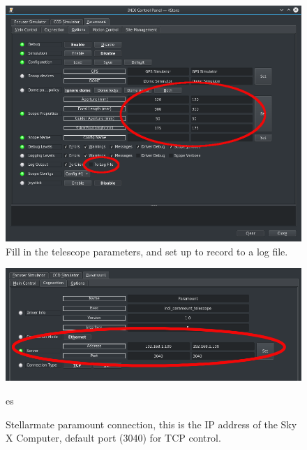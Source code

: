 \begin{figure}[h!]
\centering
\includegraphics[width=\textwidth]{images/smate_paramount_options-2.png}
\caption[Stellarmate paramount options]{Fill in the telescope parameters, and set
up to record to a log file.}
\label{figure:SmateParamountOptions }
\end{figure}

\begin{figure}[h!]
\centering
\includegraphics[width=\textwidth]{images/smate_paramount_connection-2.png}
\caption[Stellarmate paramount connection]{Stellarmate paramount connection, this is
the IP address of the Sky X Computer, default port (3040) for TCP control.}
\label{figure:SmateParamountConnection.png}
es
\end{figure}

